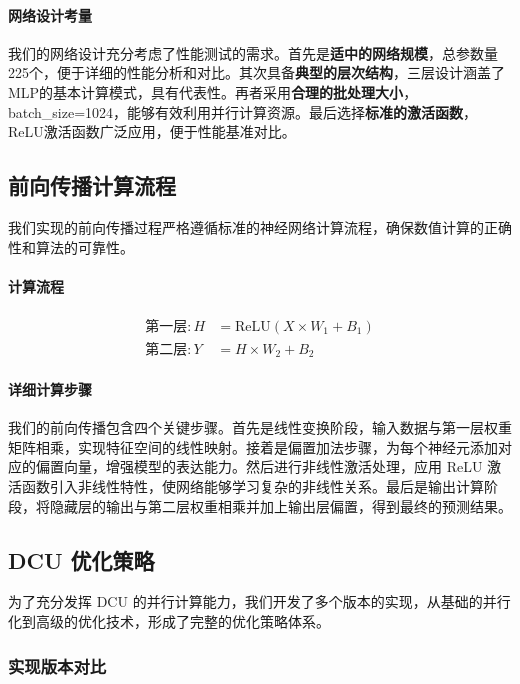 \documentclass[a4paper]{article}
\begin{document}
\paragraph{网络设计考量}

我们的网络设计充分考虑了性能测试的需求。首先是\textbf{适中的网络规模}，总参数量225个，便于详细的性能分析和对比。其次具备\textbf{典型的层次结构}，三层设计涵盖了MLP的基本计算模式，具有代表性。再者采用\textbf{合理的批处理大小}，batch\_size=1024，能够有效利用并行计算资源。最后选择\textbf{标准的激活函数}，ReLU激活函数广泛应用，便于性能基准对比。

\subsection{前向传播计算流程}

我们实现的前向传播过程严格遵循标准的神经网络计算流程，确保数值计算的正确性和算法的可靠性。

\paragraph{计算流程}

\begin{align}
\text{第一层}: H &= \text{ReLU}(X \times W_1 + B_1) \\
\text{第二层}: Y &= H \times W_2 + B_2
\end{align}

\paragraph{详细计算步骤}

我们的前向传播包含四个关键步骤。首先是线性变换阶段，输入数据与第一层权重矩阵相乘，实现特征空间的线性映射。接着是偏置加法步骤，为每个神经元添加对应的偏置向量，增强模型的表达能力。然后进行非线性激活处理，应用 ReLU 激活函数引入非线性特性，使网络能够学习复杂的非线性关系。最后是输出计算阶段，将隐藏层的输出与第二层权重相乘并加上输出层偏置，得到最终的预测结果。

\subsection{DCU 优化策略}

为了充分发挥 DCU 的并行计算能力，我们开发了多个版本的实现，从基础的并行化到高级的优化技术，形成了完整的优化策略体系。

\subsubsection{实现版本对比}
\end{document}
